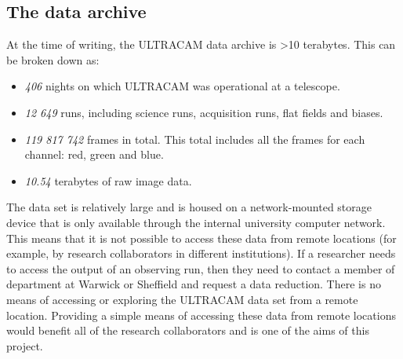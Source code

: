 \subsection{The data archive}
At the time of writing, the ULTRACAM data archive is \textgreater 10 terabytes. This can be broken down as:
\begin{itemize}
	\item \emph{406} nights on which ULTRACAM was operational at a telescope.
	\item \emph{12 649} runs, including science runs, acquisition runs, flat fields and biases. 
	\item \emph{119 817 742} frames in total. This total includes all the frames for each channel: red, green and blue.
	\item \emph{10.54} terabytes of raw image data.
\end{itemize} 

The data set is relatively large and is housed on a network-mounted storage device that is only available through the internal university computer network. This means that it is not possible to access these data from remote locations (for example, by research collaborators in different institutions). If a researcher needs to access the output of an observing run, then they need to contact a member of department at Warwick or Sheffield and request a data reduction. There is no means of accessing or exploring the ULTRACAM data set from a remote location. Providing a simple means of accessing these data from remote locations would benefit all of the research collaborators and is one of the aims of this project.
